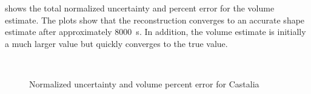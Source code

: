  shows the total normalized uncertainty and percent error for the volume estimate. 
The plots show that the reconstruction converges to an accurate shape estimate after approximately \SI{8000}{\second}.
In addition, the volume estimate is initially a much larger value but quickly converges to the true value.
\begin{figure}[htbp]
    \centering
    ~
    \caption{Normalized uncertainty and volume percent error for Castalia\label{fig:castalia_metrics}}
\end{figure}
